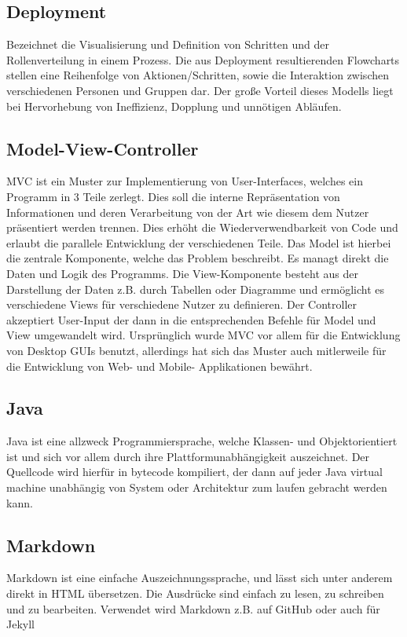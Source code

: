     \subsection{Deployment}
    Bezeichnet die Visualisierung und Definition von Schritten und der 
    Rollenverteilung in einem Prozess. Die aus Deployment resultierenden 
    Flowcharts stellen eine Reihenfolge von Aktionen/Schritten, sowie die 
    Interaktion zwischen verschiedenen Personen und Gruppen dar. Der große Vorteil 
    dieses Modells liegt bei Hervorhebung von Ineffizienz, Dopplung und unnötigen
    Abläufen.

    \subsection{Model-View-Controller}
    MVC ist ein Muster zur Implementierung von User-Interfaces, welches ein 
    Programm in 3 Teile zerlegt. Dies soll die interne Repräsentation von 
    Informationen und deren Verarbeitung von der Art wie diesem dem Nutzer 
    präsentiert werden trennen. Dies erhöht die Wiederverwendbarkeit
    von Code und erlaubt die parallele Entwicklung der verschiedenen Teile. Das 
    Model ist hierbei die zentrale Komponente, welche das Problem beschreibt. Es 
    managt direkt die Daten und Logik des Programms. Die View-Komponente besteht 
    aus der Darstellung der Daten z.B. durch Tabellen oder Diagramme und 
    ermöglicht es verschiedene Views für verschiedene Nutzer zu definieren.
    Der Controller akzeptiert User-Input der dann in die entsprechenden Befehle 
    für Model und View umgewandelt wird. Ursprünglich wurde MVC vor allem für die 
    Entwicklung von Desktop GUIs benutzt, allerdings hat sich das Muster auch 
    mitlerweile für die Entwicklung von Web- und Mobile- Applikationen bewährt.

    \subsection{Java}
    Java ist eine allzweck Programmiersprache, welche Klassen- und 
    Objektorientiert ist und sich vor allem durch ihre Plattformunabhängigkeit 
    auszeichnet. Der Quellcode wird hierfür in bytecode kompiliert, der dann auf 
    jeder Java virtual machine unabhängig von System oder Architektur zum laufen 
    gebracht werden kann.

    \subsection{Markdown}
    Markdown ist eine einfache Auszeichnungssprache, und lässt sich unter anderem 
    direkt in HTML übersetzen. Die Ausdrücke sind einfach zu lesen, zu schreiben 
    und zu bearbeiten. 
    Verwendet wird Markdown z.B. auf GitHub oder auch für Jekyll

